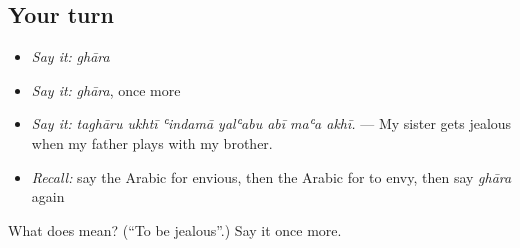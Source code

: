 \subsection*{Your turn}
\begin{itemize}
\raggedright
  \item \emph{Say it:} \emph{ghāra}
  \item \emph{Say it:} \emph{ghāra}, once more
  \item \emph{Say it:} \emph{taghāru ukhtī ʿindamā yalʿabu abī maʿa akhī.} — My sister gets jealous when my father plays with my brother.
  \item \emph{Recall:} say the Arabic for envious, then the Arabic for to envy, then say \emph{ghāra} again
\end{itemize}

\begin{tcolorbox}[breakable,colback=teal!4,colframe=teal!35!black,title={Before you move on}]
What does  mean? (\textquotedblleft{}To be jealous\textquotedblright{}.) Say it once more.
\end{tcolorbox}
